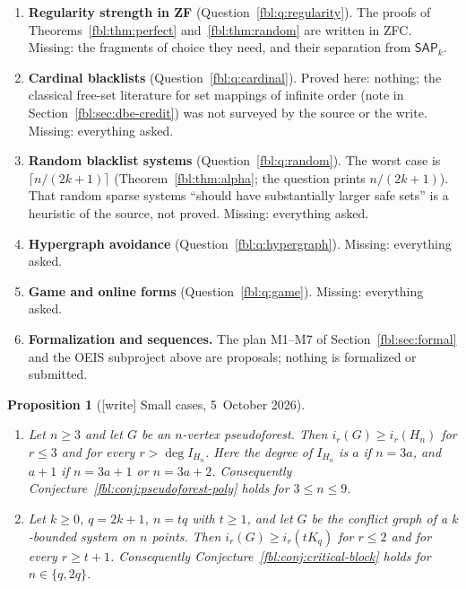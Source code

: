 \documentclass[11pt]{article}
\newtheorem{proposition}[theorem]{Proposition}
\theoremstyle{definition}
\theoremstyle{remark}
\newcommand{\SAP}{\mathsf{SAP}}
\begin{document}
\begin{enumerate}[leftmargin=*,label=\textbf{\arabic*.},ref=\arabic*]
 samples (Theorem~\ref{fbl:thm:random}). Missing: everything asked.
\item\label{fbl:fq:regularity} \textbf{Regularity strength in ZF}
 (Question~\ref{fbl:q:regularity}). The proofs of
 Theorems~\ref{fbl:thm:perfect} and~\ref{fbl:thm:random} are written in
 ZFC. Missing: the fragments of choice they need, and their separation from
 $\SAP_k$.
\item\label{fbl:fq:cardinal} \textbf{Cardinal blacklists}
 (Question~\ref{fbl:q:cardinal}). Proved here: nothing; the classical
 free-set literature for set mappings of infinite order (note in
 Section~\ref{fbl:sec:dbe-credit}) was not surveyed by the source or the
 write. Missing: everything asked.
\item\label{fbl:fq:random} \textbf{Random blacklist systems}
 (Question~\ref{fbl:q:random}). The worst case is
 $\lceil n/(2k+1)\rceil$ (Theorem~\ref{fbl:thm:alpha}; the question prints
 $n/(2k+1)$). That random sparse systems ``should have substantially larger
 safe sets'' is a heuristic of the source, not proved. Missing: everything
 asked.
\item\label{fbl:fq:hypergraph} \textbf{Hypergraph avoidance}
 (Question~\ref{fbl:q:hypergraph}). Missing: everything asked.
\item\label{fbl:fq:game} \textbf{Game and online forms}
 (Question~\ref{fbl:q:game}). Missing: everything asked.
\item\label{fbl:fq:formal} \textbf{Formalization and sequences.} The plan
 M1--M7 of Section~\ref{fbl:sec:formal} and the OEIS subproject above are
 proposals; nothing is formalized or submitted.
\end{enumerate}

\begin{proposition}[{[write]} Small cases, 5~October 2026]
\label{fbl:prop:small}
\begin{enumerate}[label=(\alph*)]
\item Let $n\ge3$ and let $G$ be an $n$-vertex pseudoforest. Then
 $i_r(G)\ge i_r(H_n)$ for $r\le3$ and for every $r>\deg I_{H_n}$. Here
 the degree of $I_{H_n}$ is $a$ if $n=3a$, and $a+1$ if $n=3a+1$ or
 $n=3a+2$. Consequently Conjecture~\ref{fbl:conj:pseudoforest-poly} holds for
 $3\le n\le9$.
\item Let $k\ge0$, $q=2k+1$, $n=tq$ with $t\ge1$, and let $G$ be the
 conflict graph of a $k$-bounded system on $n$ points. Then
 $i_r(G)\ge i_r(tK_q)$ for $r\le2$ and for every $r\ge t+1$. Consequently
 Conjecture~\ref{fbl:conj:critical-block} holds for $n\in\{q,2q\}$.
\end{enumerate}
\end{proposition}
\end{document}
